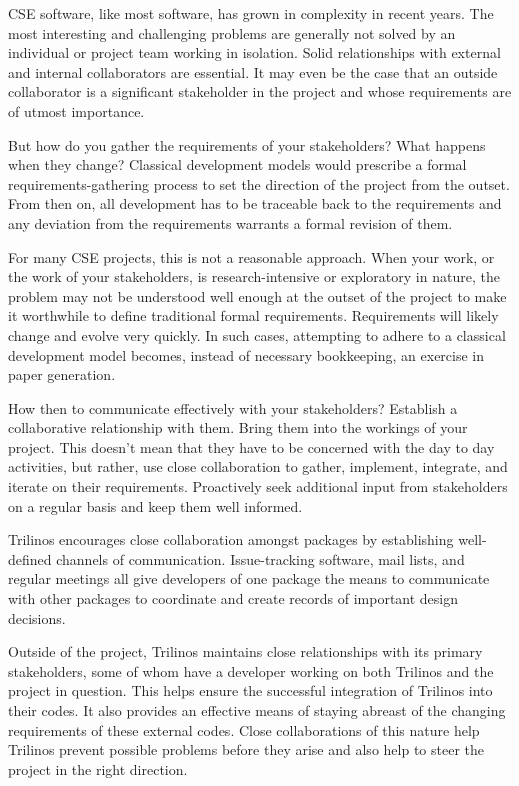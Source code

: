 \documentclass[12pt,relax]{article}
\begin{document}
CSE software, like most software, has grown in complexity in recent years.
The most interesting and challenging problems are generally not solved by an
individual or project team working in isolation.  Solid relationships with 
external and internal collaborators are essential.  It may even be the case
that an outside collaborator is a significant stakeholder in the project and 
whose requirements are of utmost importance.

But how do you gather the requirements of your stakeholders?  What happens
when they change?  Classical development models would prescribe a formal
requirements-gathering process to set the direction of the project from the
outset.  From then on, all development has to be traceable back to the
requirements and any deviation from the requirements warrants a formal revision
of them.  

For many CSE projects, this is not a reasonable approach.  When your work, or 
the work of your stakeholders, is research-intensive or exploratory in nature, 
the problem may not be understood well enough at the outset of the project to 
make it worthwhile to define traditional formal requirements.  Requirements 
will likely change and evolve very quickly.  In such cases, attempting to
adhere to a classical development model becomes, instead of necessary
bookkeeping, an exercise in paper generation.

How then to communicate effectively with your stakeholders?  Establish a
collaborative relationship with them.  Bring them into the workings of your
project.  This doesn't mean that they have to be concerned with the day to day
activities, but rather, use close collaboration to gather, implement,
integrate, and iterate on their requirements.  Proactively seek additional
input from stakeholders on a regular basis and keep them well informed.

Trilinos encourages close collaboration amongst packages by establishing
well-defined channels of communication.  Issue-tracking software, mail lists,
and regular meetings all give developers of one package the means to
communicate with other packages to coordinate and create records of important
design decisions.

Outside of the project, Trilinos maintains close relationships with its primary
stakeholders, some of whom have a developer working on both Trilinos and the
project in question.  This helps ensure the successful integration of Trilinos
into their codes.  It also provides an effective means of staying abreast of
the changing requirements of these external codes.  Close collaborations of
this nature help Trilinos prevent possible problems before they arise and also
help to steer the project in the right direction.
\end{document}
